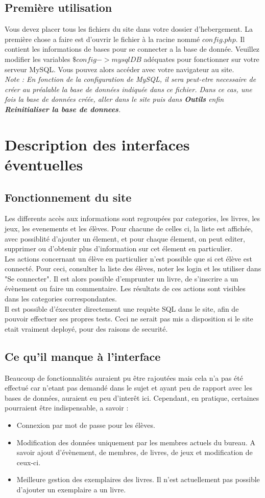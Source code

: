 \documentclass[a4paper, 11pt]{article}
\begin{document}
\subsection{Première utilisation}
Vous devez placer tous les fichiers du site dans votre dossier d'hebergement. La première chose a faire est d'ouvrir le fichier à la racine nommé $config.php$. Il contient les informations de bases pour se connecter a la base de donnée. Veuillez modifier les variables $\$config->mysqlDB$ adéquates pour fonctionner sur votre serveur MySQL. 
Vous pouvez alors accéder avec votre navigateur au site.
\\ \textit{Note : 
En fonction de la configuration de MySQL, il sera peut-etre necessaire de créer au préalable la base de données indiquée dans ce fichier. Dans ce cas, une fois la base de données créée, aller dans le site puis dans \textbf{Outils} enfin \textbf{Reinitialiser la base de donnees}.}
\section{Description des interfaces éventuelles}
\subsection{Fonctionnement du site}
Les differents accès aux informations sont regroupées par categories, les livres, les jeux, les evenements et les élèves. Pour chacune de celles ci, la liste est affichée, avec possiblité d'ajouter un élement, et pour chaque élement, on peut editer, supprimer ou d'obtenir plus d'information sur cet élement en particulier.
\\Les actions concernant un élève en particulier n'est possible que si cet élève est connecté. Pour ceci, consulter la liste des élèves, noter les login et les utiliser dans "Se connecter". Il est alors possible d'emprunter un livre, de s'inscrire a un évènement ou faire un commentaire. Les résultats de ces actions sont visibles dans les categories correspondantes.
\\Il est possible d'éxecuter directement une requète SQL dans le site, afin de pouvoir effectuer ses propres tests. Ceci ne serait pas mis a disposition si le site etait vraiment deployé, pour des raisons de securité.
\subsection{Ce qu'il manque à l'interface}
Beaucoup de fonctionnalités auraient pu être rajoutées mais cela n'a pas été effectué car n'etant pas demandé dans le sujet et ayant peu de rapport avec les bases de données, auraient eu peu d'interêt ici. Cependant, en pratique, certaines pourraient être indispensable, a savoir :
\begin{itemize}
\item Connexion par mot de passe pour les élèves. 
\item Modification des données uniquement par les membres actuels du bureau. A savoir ajout d'évènement, de membres, de livres, de jeux et modification de ceux-ci.
\item Meilleure gestion des exemplaires des livres. Il n'est actuellement pas possible d'ajouter un exemplaire a un livre.
\end{itemize}
\end{document}

